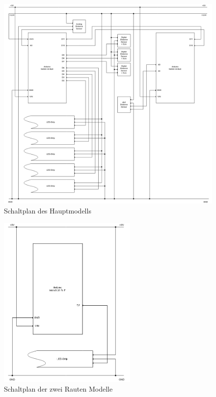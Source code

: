     \begin{figure}[H]
        \begin{center}
            \includegraphics[width=\textwidth]{media/03_technical_implementation/circuit_diagram_transmitter.png}
        \end{center}
        \caption{Schaltplan des Hauptmodells}
        \label{fig:circuit_diagram_ransmitter}
    \end{figure}

    \begin{figure}[H]
        \begin{center}
            \includegraphics[width=6.8cm]{media/03_technical_implementation/circuit_diagram_receiver.png}
        \end{center}
        \caption{Schaltplan der zwei Rauten Modelle}
        \label{fig:circuit_diagram_receiver}
    \end{figure}



